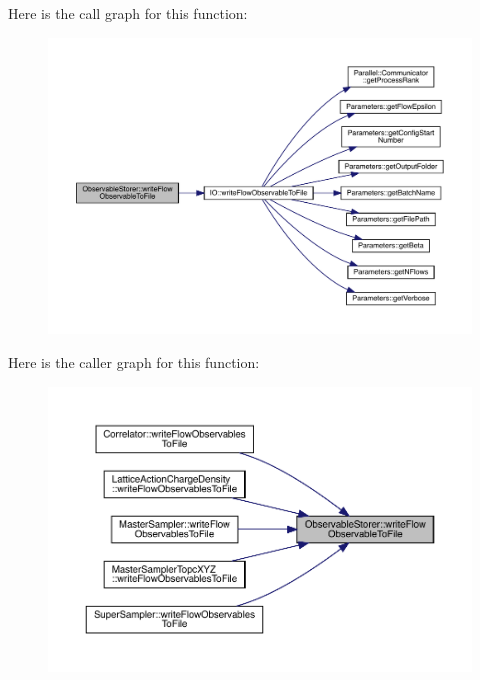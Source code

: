 Here is the call graph for this function\+:\nopagebreak
\begin{figure}[H]
\begin{center}
\leavevmode
\includegraphics[width=350pt]{class_observable_storer_af51ebd65eae2a5087cfd47ddf230da93_cgraph}
\end{center}
\end{figure}
Here is the caller graph for this function\+:\nopagebreak
\begin{figure}[H]
\begin{center}
\leavevmode
\includegraphics[width=350pt]{class_observable_storer_af51ebd65eae2a5087cfd47ddf230da93_icgraph}
\end{center}
\end{figure}
\mbox{\label{class_observable_storer_a146f9acb8a0a2ce15782d26bdc4f0bf9}} 
